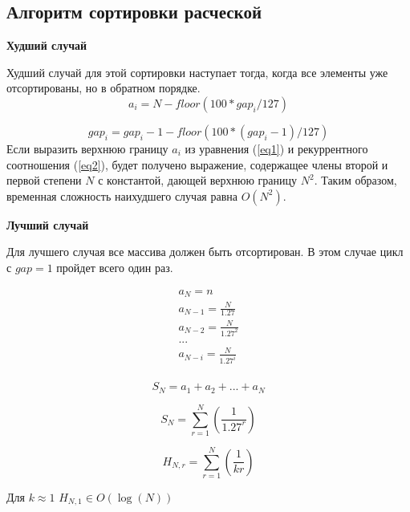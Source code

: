 \subsection{Алгоритм сортировки расческой}

\textbf{Худший случай}

Худший случай для этой сортировки наступает тогда, когда все элементы уже отсортированы, но в обратном порядке. 
\begin{equation}\label{eq1}
	a_{i} = N - floor( 100 * gap_{i} / 127 )
\end{equation}

\begin{equation}\label{eq2}
	gap_{i} = gap_{i}-1 - floor( 100 * (gap_{i}-1) / 127 )
\end{equation}
Если выразить верхнюю границу  $a_{i}$ из уравнения (\ref{eq1}) и рекуррентного соотношения (\ref{eq2}), будет получено выражение, содержащее члены второй и первой степени $N$ с константой, дающей верхнюю границу $N^{2}$. Таким образом, временная сложность наихудшего случая равна $O(N^{2})$.

\textbf{Лучший случай}

Для лучшего случая все массива должен быть отсортирован. В этом случае цикл с $gap = 1$ пройдет всего один раз. 

\begin{equation}
	\begin{array}{cc}
	a_{N} = n \\
	a_{N - 1} = \frac{N}{1.27} \\
	a_{N - 2} = \frac{N}{1.27^{2}} \\ 
	. . . \\
	a_{N - i} = \frac{N}{1.27^{i}} \\
	\end{array}
\end{equation}

\begin{equation}
	S_{N} = a_{1} + a_{2} + ... + a_{N}
\end{equation}

\begin{equation}
	S_{N} =  \sum_{r=1}^N (\frac{1}{1.27^{r}})
\end{equation}

\begin{equation}
	H_{N, r} = \sum_{r=1}^{N}(\frac{1}{kr})
\end{equation}

Для $k \approx 1$ $H_{N,1} \in O(\log(N))$

